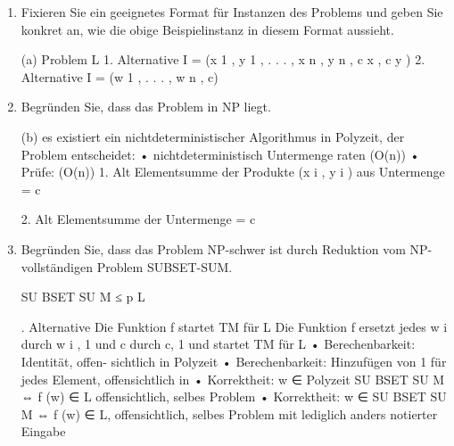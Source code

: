 \documentclass{lehramt-informatik-aufgabe}
\begin{document}
\begin{enumerate}


\item Fixieren Sie ein geeignetes Format für Instanzen des Problems und
geben Sie konkret an, wie die obige Beispielinstanz in diesem Format
aussieht.

\begin{liAntwort}
(a) Problem L
1. Alternative
I = (x 1 , y 1 , . . . , x n , y n , c x , c y )
2. Alternative
I = (w 1 , . . . , w n , c)
\end{liAntwort}


\item Begründen Sie, dass das Problem in NP liegt.

\begin{liAntwort}
(b) es existiert ein nichtdeterministischer Algorithmus in Polyzeit, der Problem entscheidet:
• nichtdeterministisch Untermenge raten (O(n))
• Prüfe: (O(n))
1. Alt Elementsumme der Produkte (x i , y i ) aus Untermenge = c

2. Alt Elementsumme der Untermenge = c
\end{liAntwort}


\item Begründen Sie, dass das Problem NP-schwer ist durch Reduktion vom
NP-vollständigen Problem SUBSET-SUM.

\begin{liAntwort}
SU BSET SU M ≤ p L

. Alternative
Die Funktion f startet TM für L
Die Funktion f ersetzt jedes w i durch w i , 1
und c durch c, 1 und startet TM für L
• Berechenbarkeit: Identität, offen-
sichtlich in Polyzeit
• Berechenbarkeit: Hinzufügen von 1
für jedes Element, offensichtlich in
• Korrektheit:
w
∈
Polyzeit
SU BSET SU M ⇔ f (w) ∈ L
offensichtlich, selbes Problem
• Korrektheit:
w
∈
SU BSET SU M ⇔ f (w) ∈ L,
offensichtlich, selbes Problem mit
lediglich anders notierter Eingabe
\end{liAntwort}

\end{enumerate}
\end{document}
